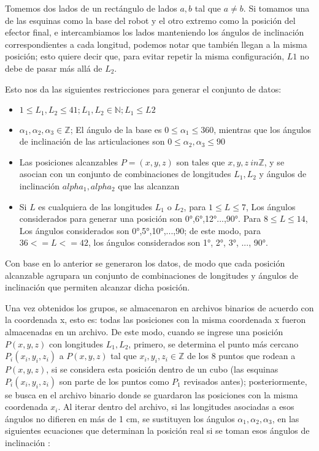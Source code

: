 Tomemos dos lados de un rectángulo de lados $a,b$ tal que $a \neq b$. Si tomamos una de las esquinas como la base del robot y el otro extremo como la posición del efector final, e intercambiamos los lados manteniendo los ángulos de inclinación correspondientes a cada longitud, podemos notar que también llegan a la misma posición; esto quiere decir que, para evitar repetir la misma configuración, $L1$ no debe de pasar más allá de $L_2$.

Esto nos da las siguientes restricciones para generar el conjunto de datos:

\begin{itemize}
	
	\item $ 1 \leq L_1, L_2 \leq 41; L_1, L_2 \in \mathbb{N}; L_1 \leq L2$ 
	
	\item $\alpha_1, \alpha_2, \alpha_3 \in \mathbb{Z}$; El ángulo de la base es $ 0 \leq \alpha_1 \leq 360$, mientras que los ángulos de inclinación de las articulaciones son $ 0 \leq \alpha_2, \alpha_3 \leq 90$
	
	\item Las posiciones alcanzables $P = (x, y, z)$ son tales que $x,y,z \ in \mathbb{Z}$, y se asocian con un conjunto de combinaciones de longitudes $L_1, L_2$ y ángulos de inclinación $alpha_1, alpha_2$ que las alcanzan
	
	\item Si $L$ es cualquiera de las longitudes $L_1$ o $L_2$, para $1 \leq L \leq 7$, Los ángulos considerados para generar una posición son 0°,6°,12°...,90°. Para $8 \leq L \leq 14$, Los ángulos considerados son 0°,5°,10°,...,90; de este modo, para $36 <= L <= 42$, los ángulos considerados son 1°, 2°, 3°, ..., 90°.
	
\end{itemize}

Con base en lo anterior se generaron los datos, de modo que cada posición alcanzable agrupara un conjunto de combinaciones de longitudes y ángulos de inclinación que permiten alcanzar dicha posición.

Una vez obtenidos los grupos, se almacenaron en archivos binarios de acuerdo con la coordenada x, esto es: todas las posiciones con la misma coordenada x fueron almacenadas en un archivo. De este modo, cuando se ingrese una posición $P(x,y,z)$ con longitudes $L_1, L_2$, primero, se determina el punto más cercano $P_i(x_i,y_i,z_i)$ a $P(x,y,z)$ tal que $x_i,y_i,z_i \in \mathbb{Z}$ de los 8 puntos que rodean a $P(x,y,z)$, si se considera esta posición dentro de un cubo (las esquinas $P_i(x_i,y_i,z_i)$ son parte de los puntos como $P_1$ revisados antes); posteriormente, se busca en el archivo binario donde se guardaron las posiciones con la misma coordenada $x_i$. Al iterar dentro del archivo,  si las longitudes asociadas a esos ángulos no difieren en más de 1 cm, se sustituyen los ángulos $\alpha_1, \alpha_2, \alpha_3$, en las siguientes ecuaciones que determinan la posición real si se toman esos ángulos de inclinación :

